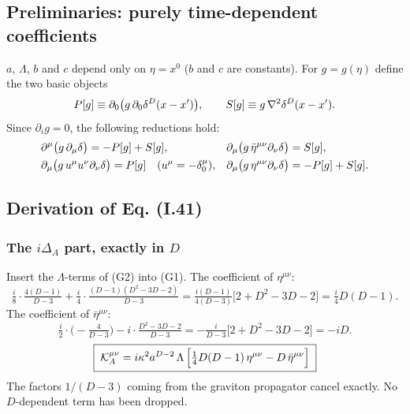 \subsection{Preliminaries: purely time-dependent coefficients \texorpdfstring{\tD}{}}
\(a\), \(\Lambda\), \(b\) and \(c\) depend only on \(\eta=x^0\) (\(b\) and \(c\) are constants).
For \(g=g(\eta)\) define the two basic objects
\begin{equation}\label{eq:t5-PS}
P[g]\equiv\partial_0\bigl(g\,\partial_0\delta^D(x-x')\bigr),\qquad S[g]\equiv g\,\nabla^2\delta^D(x-x') .
\end{equation}
Since \(\partial_ig=0\), the following reductions hold:
\begin{equation}\label{eq:t5-red}
\begin{aligned}
\relax&\partial^\mu\bigl(g\,\partial_\mu\delta\bigr)=-P[g]+S[g], &&\partial_\mu\bigl(g\,\bar\eta^{\mu\nu}\partial_\nu\delta\bigr)=S[g],\\
&\partial_\mu\bigl(g\,u^\mu u^\nu\partial_\nu\delta\bigr)=P[g]\quad(u^\mu=-\delta^\mu_0), &&\partial_\mu\bigl(g\,\eta^{\mu\nu}\partial_\nu\delta\bigr)=-P[g]+S[g].
\end{aligned}
\end{equation}

\subsection{Derivation of Eq. (I.41)}

\subsubsection{The \texorpdfstring{$i\Delta_A$}{iDeltaA} part, exactly in \texorpdfstring{$D$}{D} \texorpdfstring{\tD}{}}
Insert the \(\Lambda\)-terms of (G2) into (G1).
The coefficient of \(\eta^{\mu\nu}\):
\begin{equation*}
\tfrac i8\cdot\tfrac{4(D-1)}{D-3}+\tfrac i4\cdot\tfrac{(D-1)(D^2-3D-2)}{D-3}
=\tfrac{i(D-1)}{4(D-3)}\bigl[2+D^2-3D-2\bigr]=\tfrac i4D(D-1).
\end{equation*}
The coefficient of \(\bar\eta^{\mu\nu}\):
\begin{equation*}
\tfrac i2\cdot\bigl(-\tfrac4{D-3}\bigr)-i\cdot\tfrac{D^2-3D-2}{D-3}=-\tfrac{i}{D-3}\bigl[2+D^2-3D-2\bigr]=-iD.
\end{equation*}
\begin{equation}\label{eq:t5-KA}
\boxed{\;\mathcal K^{\mu\nu}_A=i\kappa^2a^{D-2}\,\Lambda\,\Bigl[\tfrac14D(D-1)\,\eta^{\mu\nu}-D\,\bar\eta^{\mu\nu}\Bigr]\;}
\end{equation}
The factors \(1/(D-3)\) coming from the graviton propagator cancel exactly. No
\(D\)-dependent term has been dropped.

